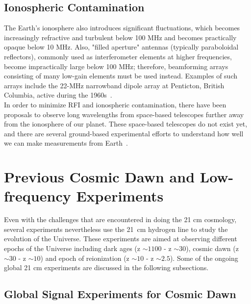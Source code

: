 	    \subsection*{Ionospheric Contamination}
	    
	    The Earth's ionosphere also introduces significant fluctuations, which becomes increasingly refractive and turbulent below 100 MHz and becomes practically opaque below 10 MHz. Also, "filled aperture" antennas (typically paraboloidal reflectors), commonly used as interferometer elements at higher frequencies, become impractically large below 100 MHz; therefore, beamforming arrays consisting of many low-gain elements must be used instead. Examples of such arrays include the 22-MHz narrowband dipole array at Penticton, British Columbia, active during the 1960s~\citep{2005ITAP...53.2480E}.\\
	    
	    
	    In order to minimize RFI and ionospheric contamination, there have been proposals to observe long wavelengths from space-based telescopes further away from the ionosphere of our planet. These space-based telescopes do not exist yet, and there are several ground-based experimental efforts to understand how well we can make measurements from Earth~\citep{2016ExA....41..271R}. \\
	    
	    \section{Previous Cosmic Dawn and Low-frequency Experiments}
	    
	    Even with the challenges that are encountered in doing the 21 cm cosmology, several experiments nevertheless use the \SI{21}{cm} hydrogen line to study the evolution of the Universe. These experiments are aimed at observing different epochs of the Universe including dark ages (z $\sim1100$ - z $\sim30$), cosmic dawn (z $\sim30$ - z $\sim10$) and epoch of reionization (z $\sim10$ - z $\sim2.5$). Some of the ongoing global 21 cm experiments are discussed in the following subsections.\\
	    
	    
	    \subsection{Global Signal Experiments for Cosmic Dawn}
	    
